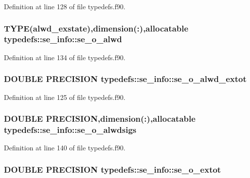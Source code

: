 Definition at line 128 of file typedefs.f90.\hypertarget{typetypedefs_1_1se__info_a838335cf3aac3f755cf712eafa14c9e0}{
\subsubsection[{se\_\-o\_\-alwd}]{\setlength{\rightskip}{0pt plus 5cm}TYPE({\bf alwd\_\-exstate}),dimension(:),allocatable {\bf typedefs::se\_\-info::se\_\-o\_\-alwd}}}
\label{typetypedefs_1_1se__info_a838335cf3aac3f755cf712eafa14c9e0}


Definition at line 134 of file typedefs.f90.\hypertarget{typetypedefs_1_1se__info_a1aa742b3b6d98a4de72c0232f9c2e2b1}{
\subsubsection[{se\_\-o\_\-alwd\_\-extot}]{\setlength{\rightskip}{0pt plus 5cm}DOUBLE PRECISION {\bf typedefs::se\_\-info::se\_\-o\_\-alwd\_\-extot}}}
\label{typetypedefs_1_1se__info_a1aa742b3b6d98a4de72c0232f9c2e2b1}


Definition at line 125 of file typedefs.f90.\hypertarget{typetypedefs_1_1se__info_a0b5d9872f495081658c1545f6b014a08}{
\subsubsection[{se\_\-o\_\-alwdsigs}]{\setlength{\rightskip}{0pt plus 5cm}DOUBLE PRECISION,dimension(:),allocatable {\bf typedefs::se\_\-info::se\_\-o\_\-alwdsigs}}}
\label{typetypedefs_1_1se__info_a0b5d9872f495081658c1545f6b014a08}


Definition at line 140 of file typedefs.f90.\hypertarget{typetypedefs_1_1se__info_a4619ac26e35125680fe8e38428eae0b9}{
\subsubsection[{se\_\-o\_\-extot}]{\setlength{\rightskip}{0pt plus 5cm}DOUBLE PRECISION {\bf typedefs::se\_\-info::se\_\-o\_\-extot}}}
\label{typetypedefs_1_1se__info_a4619ac26e35125680fe8e38428eae0b9}


